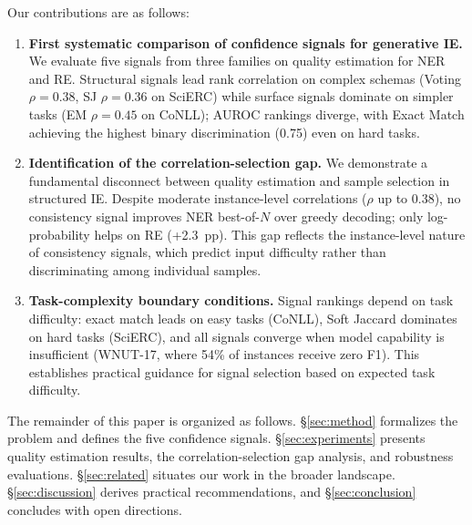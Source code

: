 Our contributions are as follows:
\begin{enumerate}
    \item \textbf{First systematic comparison of confidence signals for generative IE.}
    We evaluate five signals from three families on quality estimation for NER and RE.
    Structural signals lead rank correlation on complex schemas (Voting $\rho{=}0.38$, SJ $\rho{=}0.36$ on SciERC) while surface signals dominate on simpler tasks (EM $\rho{=}0.45$ on CoNLL); AUROC rankings diverge, with Exact Match achieving the highest binary discrimination (0.75) even on hard tasks.

    \item \textbf{Identification of the correlation-selection gap.}
    We demonstrate a fundamental disconnect between quality estimation and sample selection in structured IE.
    Despite moderate instance-level correlations ($\rho$ up to 0.38), no consistency signal improves NER best-of-$N$ over greedy decoding; only log-probability helps on RE (+2.3~pp).
    This gap reflects the instance-level nature of consistency signals, which predict input difficulty rather than discriminating among individual samples.

    \item \textbf{Task-complexity boundary conditions.}
    Signal rankings depend on task difficulty: exact match leads on easy tasks (CoNLL), Soft Jaccard dominates on hard tasks (SciERC), and all signals converge when model capability is insufficient (WNUT-17, where 54\% of instances receive zero F1).
    This establishes practical guidance for signal selection based on expected task difficulty.
\end{enumerate}

The remainder of this paper is organized as follows.
\S\ref{sec:method} formalizes the problem and defines the five confidence signals.
\S\ref{sec:experiments} presents quality estimation results, the correlation-selection gap analysis, and robustness evaluations.
\S\ref{sec:related} situates our work in the broader landscape.
\S\ref{sec:discussion} derives practical recommendations, and \S\ref{sec:conclusion} concludes with open directions.
